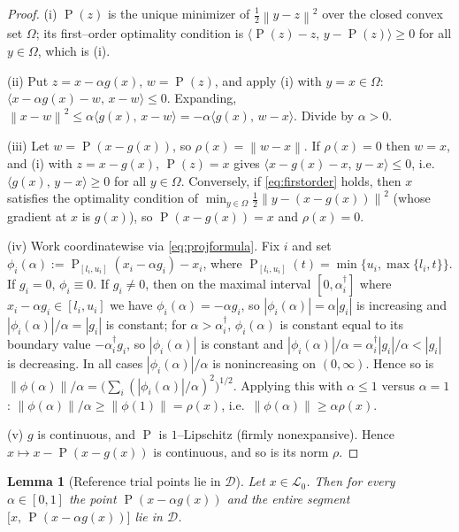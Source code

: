 \documentclass[12pt]{article}
\newtheorem{lemma}{Lemma}
\DeclareMathOperator{\proj}{P}
\newcommand{\norm}[1]{\left\lVert #1 \right\rVert}
\newcommand{\inner}[2]{\langle #1,\, #2\rangle}
\begin{document}
\begin{proof}
(i) $\proj(z)$ is the unique minimizer of $\tfrac12\norm{y-z}^2$ over the
closed convex set $\Omega$; its first--order optimality condition is
$\inner{\proj(z)-z}{y-\proj(z)}\ge0$ for all $y\in\Omega$, which is (i).

(ii) Put $z=x-\alpha g(x)$, $w=\proj(z)$, and apply (i) with $y=x\in\Omega$:
$\inner{x-\alpha g(x)-w}{x-w}\le0$. Expanding,
$\norm{x-w}^2\le\alpha\inner{g(x)}{x-w}=-\alpha\inner{g(x)}{w-x}$. Divide by
$\alpha>0$.

(iii) Let $w=\proj(x-g(x))$, so $\rho(x)=\norm{w-x}$. If $\rho(x)=0$ then
$w=x$, and (i) with $z=x-g(x)$, $\proj(z)=x$ gives
$\inner{x-g(x)-x}{y-x}\le0$, i.e.\ $\inner{g(x)}{y-x}\ge0$ for all
$y\in\Omega$. Conversely, if \eqref{eq:firstorder} holds, then $x$ satisfies
the optimality condition of $\min_{y\in\Omega}\tfrac12\norm{y-(x-g(x))}^2$
(whose gradient at $x$ is $g(x)$), so $\proj(x-g(x))=x$ and $\rho(x)=0$.

(iv) Work coordinatewise via \eqref{eq:projformula}. Fix $i$ and set
$\phi_i(\alpha):=\proj_{[l_i,u_i]}(x_i-\alpha g_i)-x_i$, where
$\proj_{[l_i,u_i]}(t)=\min\{u_i,\max\{l_i,t\}\}$. If $g_i=0$, $\phi_i\equiv0$.
If $g_i\neq0$, then on the maximal interval $[0,\alpha_i^\dagger]$ where
$x_i-\alpha g_i\in[l_i,u_i]$ we have $\phi_i(\alpha)=-\alpha g_i$, so
$|\phi_i(\alpha)|=\alpha|g_i|$ is increasing and $|\phi_i(\alpha)|/\alpha=|g_i|$
is constant; for $\alpha>\alpha_i^\dagger$, $\phi_i(\alpha)$ is constant equal to
its boundary value $-\alpha_i^\dagger g_i$, so $|\phi_i(\alpha)|$ is constant and
$|\phi_i(\alpha)|/\alpha=\alpha_i^\dagger|g_i|/\alpha<|g_i|$ is decreasing. In
all cases $|\phi_i(\alpha)|/\alpha$ is nonincreasing on $(0,\infty)$. Hence so is
$\norm{\phi(\alpha)}/\alpha=\big(\sum_i(|\phi_i(\alpha)|/\alpha)^2\big)^{1/2}$.
Applying this with $\alpha\le1$ versus $\alpha=1$:
$\norm{\phi(\alpha)}/\alpha\ge\norm{\phi(1)}=\rho(x)$, i.e.\
$\norm{\phi(\alpha)}\ge\alpha\rho(x)$.

(v) $g$ is continuous, and $\proj$ is $1$--Lipschitz (firmly nonexpansive).
Hence $x\mapsto x-\proj(x-g(x))$ is continuous, and so is its norm $\rho$.
\end{proof}

\begin{lemma}[Reference trial points lie in $\mathcal D$]\label{lem:Dtrial}
Let $x\in\mathcal L_0$. Then for every $\alpha\in[0,1]$ the point
$\proj(x-\alpha g(x))$ and the entire segment
$\big[x,\,\proj(x-\alpha g(x))\big]$ lie in $\mathcal D$.
\end{lemma}
\end{document}
